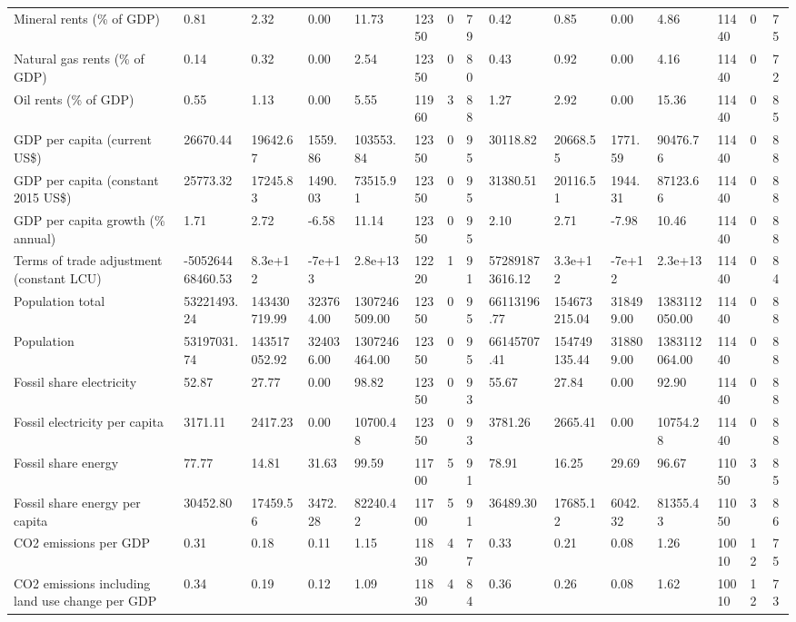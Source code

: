 \begin{longtable}{lllllllllllllll}
\addlinespace
Mineral rents (\% of GDP) & 0.81 & 2.32 & 0.00 & 11.73 & 12350 & 0 & 79 & 0.42 & 0.85 & 0.00 & 4.86 & 11440 & 0 & 75\\
Natural gas rents (\% of GDP) & 0.14 & 0.32 & 0.00 & 2.54 & 12350 & 0 & 80 & 0.43 & 0.92 & 0.00 & 4.16 & 11440 & 0 & 72\\
Oil rents (\% of GDP) & 0.55 & 1.13 & 0.00 & 5.55 & 11960 & 3 & 88 & 1.27 & 2.92 & 0.00 & 15.36 & 11440 & 0 & 85\\
GDP per capita (current US\$) & 26670.44 & 19642.67 & 1559.86 & 103553.84 & 12350 & 0 & 95 & 30118.82 & 20668.55 & 1771.59 & 90476.76 & 11440 & 0 & 88\\
GDP per capita (constant 2015 US\$) & 25773.32 & 17245.83 & 1490.03 & 73515.91 & 12350 & 0 & 95 & 31380.51 & 20116.51 & 1944.31 & 87123.66 & 11440 & 0 & 88\\
\addlinespace
GDP per capita growth (\% annual) & 1.71 & 2.72 & -6.58 & 11.14 & 12350 & 0 & 95 & 2.10 & 2.71 & -7.98 & 10.46 & 11440 & 0 & 88\\
Terms of trade adjustment (constant LCU) & -505264468460.53 & 8.3e+12 & -7e+13 & 2.8e+13 & 12220 & 1 & 91 & 572891873616.12 & 3.3e+12 & -7e+12 & 2.3e+13 & 11440 & 0 & 84\\
Population total & 53221493.24 & 143430719.99 & 323764.00 & 1307246509.00 & 12350 & 0 & 95 & 66113196.77 & 154673215.04 & 318499.00 & 1383112050.00 & 11440 & 0 & 88\\
Population & 53197031.74 & 143517052.92 & 324036.00 & 1307246464.00 & 12350 & 0 & 95 & 66145707.41 & 154749135.44 & 318809.00 & 1383112064.00 & 11440 & 0 & 88\\
Fossil share electricity & 52.87 & 27.77 & 0.00 & 98.82 & 12350 & 0 & 93 & 55.67 & 27.84 & 0.00 & 92.90 & 11440 & 0 & 88\\
\addlinespace
Fossil electricity per capita & 3171.11 & 2417.23 & 0.00 & 10700.48 & 12350 & 0 & 93 & 3781.26 & 2665.41 & 0.00 & 10754.28 & 11440 & 0 & 88\\
Fossil share energy & 77.77 & 14.81 & 31.63 & 99.59 & 11700 & 5 & 91 & 78.91 & 16.25 & 29.69 & 96.67 & 11050 & 3 & 85\\
Fossil share energy per capita & 30452.80 & 17459.56 & 3472.28 & 82240.42 & 11700 & 5 & 91 & 36489.30 & 17685.12 & 6042.32 & 81355.43 & 11050 & 3 & 86\\
CO2 emissions per GDP & 0.31 & 0.18 & 0.11 & 1.15 & 11830 & 4 & 77 & 0.33 & 0.21 & 0.08 & 1.26 & 10010 & 12 & 75\\
CO2 emissions including land use change per GDP & 0.34 & 0.19 & 0.12 & 1.09 & 11830 & 4 & 84 & 0.36 & 0.26 & 0.08 & 1.62 & 10010 & 12 & 73\\

\end{longtable}

